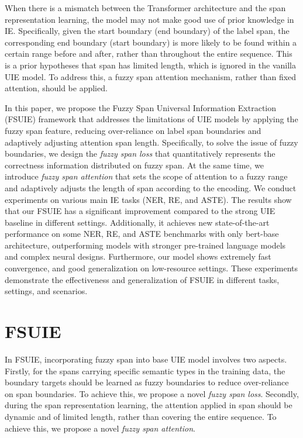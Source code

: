 \documentclass[11pt]{article}
\begin{document}
When there is a mismatch between the Transformer architecture and the span representation learning, the model may not make good use of prior knowledge in IE. Specifically, given the start boundary (end boundary) of the label span, the corresponding end boundary (start boundary) is more likely to be found within a certain range before and after, rather than throughout the entire sequence. This is a prior hypotheses that span has limited length, which is ignored in the vanilla UIE model. To address this, a fuzzy span attention mechanism, rather than fixed attention, should be applied.



In this paper, we propose the Fuzzy Span Universal Information Extraction (FSUIE) framework that addresses the limitations of UIE models by applying the fuzzy span feature, reducing over-reliance on label span boundaries and adaptively adjusting attention span length. Specifically, to solve the issue of fuzzy boundaries, we design the \textit{fuzzy span loss} that quantitatively represents the correctness information distributed on fuzzy span. At the same time, we introduce \textit{fuzzy span attention} that sets the scope of attention to a fuzzy range and adaptively adjusts the length of span according to the encoding.
We conduct experiments on various main IE tasks (NER, RE, and ASTE). The results show that our FSUIE has a significant improvement compared to the strong UIE baseline in different settings. Additionally, it achieves new state-of-the-art performance on some NER, RE, and ASTE benchmarks with only bert-base architecture, outperforming models with stronger pre-trained language models and complex neural designs. Furthermore, our model shows extremely fast convergence, and good generalization on low-resource settings. These experiments demonstrate the effectiveness and generalization of FSUIE in different tasks, settings, and scenarios.



\section{FSUIE}



In FSUIE, incorporating fuzzy span into base UIE model involves two aspects. Firstly, for the spans carrying specific semantic types in the training data, the boundary targets should be learned as fuzzy boundaries to reduce over-reliance on span boundaries. To achieve this, we propose a novel \textit{fuzzy span loss}. Secondly, during the span representation learning, the attention applied in span should be dynamic and of limited length, rather than covering the entire sequence. To achieve this, we propose a novel \textit{fuzzy span attention}.
\end{document}

